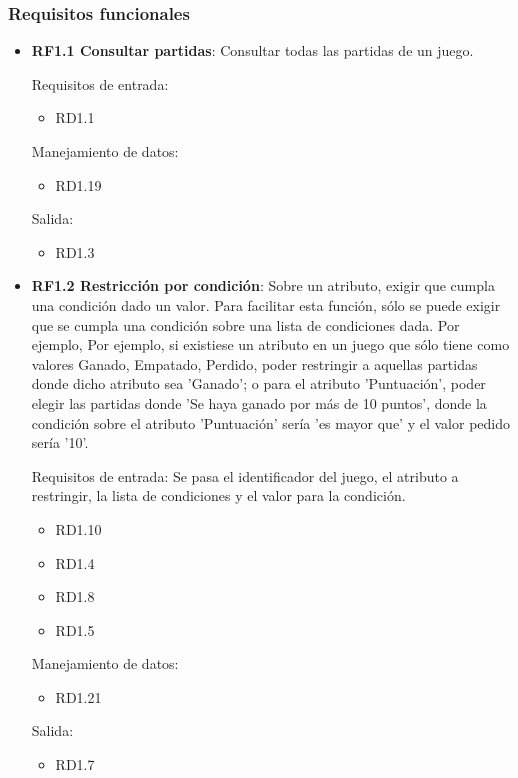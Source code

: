 \subsubsection{Requisitos funcionales}
\begin{itemize}
	\item \textbf{RF1.1 Consultar partidas}: Consultar todas las partidas de un juego.
	
	Requisitos de entrada:
	\begin{itemize}
		\item RD1.1
	\end{itemize}
	Manejamiento de datos:
	\begin{itemize}
		\item RD1.19
	\end{itemize}
	Salida:
	\begin{itemize}
		\item RD1.3
	\end{itemize}
	
	
	\item \textbf{RF1.2 Restricción por condición}: Sobre un atributo, exigir que cumpla una condición dado un valor. Para facilitar esta función, sólo se puede exigir que se cumpla una condición sobre una lista de condiciones dada. Por ejemplo, Por ejemplo, si existiese un atributo en un juego que sólo tiene como valores {Ganado, Empatado, Perdido}, poder restringir a aquellas partidas donde dicho atributo sea 'Ganado'; o para el atributo 'Puntuación', poder elegir las partidas donde 'Se haya ganado por más de 10 puntos', donde la condición sobre el atributo 'Puntuación' sería 'es mayor que' y el valor pedido sería '10'.
	
	Requisitos de entrada: Se pasa el identificador del juego, el atributo a restringir, la lista de condiciones y el valor para la condición.
	\begin{itemize}
		\item RD1.10
		\item RD1.4
		\item RD1.8
		\item RD1.5
	\end{itemize}
	Manejamiento de datos: 
	\begin{itemize}
		\item RD1.21
	\end{itemize}
	Salida:
	\begin{itemize}
		\item RD1.7
	\end{itemize}
	

\end{itemize}
